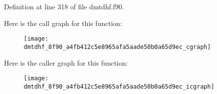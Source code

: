 Definition at line 318 of file dmtdhf.f90.



Here is the call graph for this function:\nopagebreak
\begin{figure}[H]
\begin{center}
\leavevmode
\texttt{[image: dmtdhf\_8f90\_a4fb412c5e8965afa5aade50b0a65d9ec\_cgraph]}
\end{center}
\end{figure}




Here is the caller graph for this function:\nopagebreak
\begin{figure}[H]
\begin{center}
\leavevmode
\texttt{[image: dmtdhf\_8f90\_a4fb412c5e8965afa5aade50b0a65d9ec\_icgraph]}
\end{center}
\end{figure}


